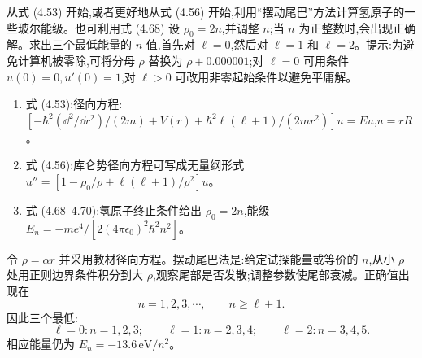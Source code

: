 \begin{question}
从式 (4.53) 开始,或者更好地从式 (4.56) 开始,利用“摆动尾巴”方法计算氢原子的一些玻尔能级。也可利用式 (4.68) 设 $\rho_0=2n$,并调整 $n$;当 $n$ 为正整数时,会出现正确解。求出三个最低能量的 $n$ 值,首先对 $\ell=0$,然后对 $\ell=1$ 和 $\ell=2$。提示:为避免计算机被零除,可将分母 $\rho$ 替换为 $\rho+0.000001$;对 $\ell=0$ 可用条件 $u(0)=0,u'(0)=1$,对 $\ell>0$ 可改用非零起始条件以避免平庸解。

\par\smallskip
{}
\begin{enumerate}[leftmargin=2.2em,itemsep=0.12em,topsep=0.12em,parsep=0pt]
\item 式 (4.53):径向方程:$[-\hbar^2(\dd^2/\dd r^2)/(2m)+V(r)+\hbar^2\ell(\ell+1)/(2mr^2)]u=Eu$,$u=rR$。
\item 式 (4.56):库仑势径向方程可写成无量纲形式 $u''=[1-\rho_0/\rho+\ell(\ell+1)/\rho^2]u$。
\item 式 (4.68--4.70):氢原子终止条件给出 $\rho_0=2n$,能级 $E_n=-me^4/[2(4\pi\epsilon_0)^2\hbar^2n^2]$。
\end{enumerate}

\end{question}
\begin{solution}

令 $\rho=\alpha r$ 并采用教材径向方程。摆动尾巴法是:给定试探能量或等价的 $n$,从小 $\rho$ 处用正则边界条件积分到大 $\rho$,观察尾部是否发散;调整参数使尾部衰减。正确值出现在
\[
n=1,2,3,\cdots,
\qquad n\ge\ell+1.
\]
因此三个最低:
\[
\ell=0: n=1,2,3;
\qquad
\ell=1: n=2,3,4;
\qquad
\ell=2: n=3,4,5.
\]
相应能量仍为 $E_n=-13.6\,\mathrm{eV}/n^2$。

\end{solution}


